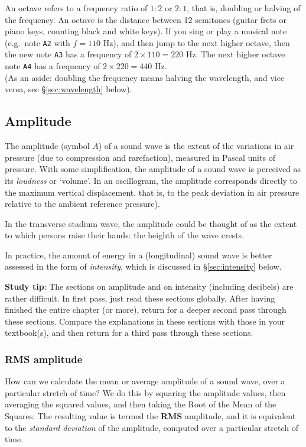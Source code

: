 \documentclass[
]{book}
\begin{document}
An octave refers to a frequency ratio of \(1:2\) or \(2:1\), that is, doubling or halving of the frequency. An octave is the distance between 12 semitones (guitar frets or piano keys, counting black and white keys). If you sing or play a musical note (e.g.~note \texttt{A2} with \(f=110\) Hz), and then jump to the next higher octave, then the new note \texttt{A3} has a frequency of \(2 \times 110=220\) Hz. The next higher octave note \texttt{A4} has a frequency of \(2 \times 220=440\) Hz.\\
(As an aside: doubling the frequency means halving the wavelength, and vice versa, see §\ref{sec:wavelength} below).

\subsection{Amplitude}\label{sec:amplitude}

The amplitude (symbol \(A\)) of a sound wave is the extent of the variations in air pressure (due to compression and rarefaction), measured in Pascal units of pressure. With some simplification, the amplitude of a sound wave is perceived as its \emph{loudness} or `volume'. In an oscillogram, the amplitude corresponds directly to the maximum vertical displacement, that is, to the peak deviation in air pressure relative to the ambient reference pressure).

In the transverse stadium wave, the amplitude could be thought of as the extent to which persons raise their hands: the heighth of the wave crests.

In practice, the amount of energy in a (longitudinal) sound wave is better assessed in the form of \emph{intensity}, which is discussed in §\ref{sec:intensity} below.

\textbf{Study tip}: The sections on amplitude and on intensity (including decibels) are rather difficult. In first pass, just read these sections globally. After having finished the entire chapter (or more), return for a deeper second pass through these sections. Compare the explanations in these sections with those in your textbook(s), and then return for a third pass through these sections.

\subsubsection{RMS amplitude}\label{rms-amplitude}

How can we calculate the mean or average amplitude of a sound wave, over a particular stretch of time? We do this by squaring the amplitude values, then averaging the squared values, and then taking the Root of the Mean of the Squares. The resulting value is termed the \textbf{RMS} amplitude, and it is equivalent to the \emph{standard deviation} of the amplitude, computed over a particular stretch of time.
\end{document}
